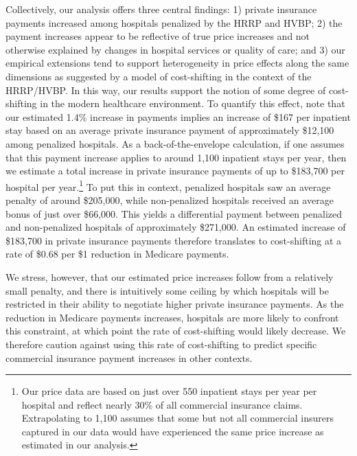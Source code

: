 \documentclass[12pt]{article}
\begin{document}
Collectively, our analysis offers three central findings: 1) private insurance payments increased among hospitals penalized by the HRRP and HVBP; 2) the payment increases appear to be reflective of true price increases and not otherwise explained by changes in hospital services or quality of care; and 3) our empirical extensions tend to support heterogeneity in price effects along the same dimensions as suggested by a model of cost-shifting in the context of the HRRP/HVBP. In this way, our results support the notion of some degree of cost-shifting in the modern healthcare environment. To quantify this effect, note that our estimated 1.4\% increase in payments implies an increase of \$167 per inpatient stay based on an average private insurance payment of approximately \$12,100 among penalized hospitals. As a back-of-the-envelope calculation, if one assumes that this payment increase applies to around 1,100 inpatient stays per year, then we estimate a total increase in private insurance payments of up to \$183,700 per hospital per year.\footnote{Our price data are based on just over 550 inpatient stays per year per hospital and reflect nearly 30\% of all commercial insurance claims. Extrapolating to 1,100 assumes that some but not all commercial insurers captured in our data would have experienced the same price increase as estimated in our analysis.} To put this in context, penalized hospitals saw an average penalty of around \$205,000, while non-penalized hospitals received an average bonus of just over \$66,000. This yields a differential payment between penalized and non-penalized hospitals of approximately \$271,000. An estimated increase of \$183,700 in private insurance payments therefore translates to cost-shifting at a rate of \$0.68 per \$1 reduction in Medicare payments.

We stress, however, that our estimated price increases follow from a relatively small penalty, and there is intuitively some ceiling by which hospitals will be restricted in their ability to negotiate higher private insurance payments. As the reduction in Medicare payments increases, hospitals are more likely to confront this constraint, at which point the rate of cost-shifting would likely decrease. We therefore caution against using this rate of cost-shifting to predict specific commercial insurance payment increases in other contexts.
\end{document}
